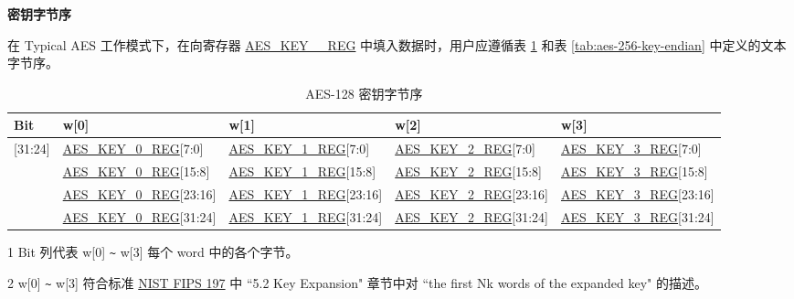 \documentclass[main\_\_CN.tex]{subfiles}
\begin{document}
\textbf{密钥字节序}

在 Typical AES 工作模式下，在向寄存器 \hyperref[regdesc:AESKEYnREG]{AES\_KEY\_\_REG} 中填入数据时，用户应遵循表 \ref{tab:aes-128-key-endian} 和表 \ref{tab:aes-256-key-endian} 中定义的文本字节序。              
\begin{table}[H]
    \centering
    \caption{AES-128 密钥字节序}
    \label{tab:aes-128-key-endian}

    \begin{threeparttable}
    \begin{tabular}{ |l|l|l|l|l| }
    \hline
        \rowcolor{lightgray}
        Bit\tnote{1} &   w[0]    &   w[1]    &   w[2]    &   w[3]\tnote{2}     \\\hline
        
        [31:24]     &   \hyperref[regdesc:AESKEYnREG]{AES\_KEY\_0\_REG}[7:0]    &   \hyperref[regdesc:AESKEYnREG]{AES\_KEY\_1\_REG}[7:0]    &   \hyperref[regdesc:AESKEYnREG]{AES\_KEY\_2\_REG}[7:0]    &   \hyperref[regdesc:AESKEYnREG]{AES\_KEY\_3\_REG}[7:0]\\ \hline
        [23:16]     &   \hyperref[regdesc:AESKEYnREG]{AES\_KEY\_0\_REG}[15:8]   &   \hyperref[regdesc:AESKEYnREG]{AES\_KEY\_1\_REG}[15:8]   &   \hyperref[regdesc:AESKEYnREG]{AES\_KEY\_2\_REG}[15:8]   &   \hyperref[regdesc:AESKEYnREG]{AES\_KEY\_3\_REG}[15:8]\\ \hline
        [15:8]  &   \hyperref[regdesc:AESKEYnREG]{AES\_KEY\_0\_REG}[23:16]  &   \hyperref[regdesc:AESKEYnREG]{AES\_KEY\_1\_REG}[23:16]  &   \hyperref[regdesc:AESKEYnREG]{AES\_KEY\_2\_REG}[23:16]  &   \hyperref[regdesc:AESKEYnREG]{AES\_KEY\_3\_REG}[23:16]\\ \hline
        [7:0]   &   \hyperref[regdesc:AESKEYnREG]{AES\_KEY\_0\_REG}[31:24]  &   \hyperref[regdesc:AESKEYnREG]{AES\_KEY\_1\_REG}[31:24]  & \hyperref[regdesc:AESKEYnREG]{AES\_KEY\_2\_REG}[31:24]    &   \hyperref[regdesc:AESKEYnREG]{AES\_KEY\_3\_REG}[31:24]\\ \hline
        \end{tabular}

        \begin{tablenotes}
            \item[1] Bit 列代表 w[0] \verb+~+ w[3] 每个 word 中的各个字节。
            \item[2] w[0] \verb+~+ w[3] 符合标准 \href{https://nvlpubs.nist.gov/nistpubs/FIPS/NIST.FIPS.197.pdf}{NIST FIPS 197} 中 ``5.2 Key Expansion" 章节中对 ``the first Nk words of the expanded key" 的描述。
        \end{tablenotes}
     \end{threeparttable}
\end{table}
\end{document}
